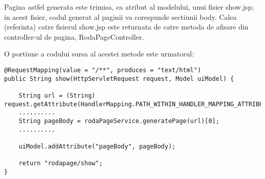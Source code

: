 \bigskip


Pagina astfel generata este trimisa, ca atribut al modelului, unui fisier show.jsp; in acest fisier, codul generat al paginii va corespunde sectiunii body. Calea (referinta) catre fisierul show.jsp este returnata de catre metoda de afisare din controller-ul de pagina, RodaPageController.

O portiune a codului sursa al acestei metode este urmatorul:

\begin{lstlisting}[breaklines=true]
@RequestMapping(value = "/**", produces = "text/html")
public String show(HttpServletRequest request, Model uiModel) {

	String url = (String) request.getAttribute(HandlerMapping.PATH_WITHIN_HANDLER_MAPPING_ATTRIBUTE);
	..........
	String pageBody = rodaPageService.generatePage(url)[0];
	..........

	uiModel.addAttribute("pageBody", pageBody);

	return "rodapage/show";
}
\end{lstlisting}	